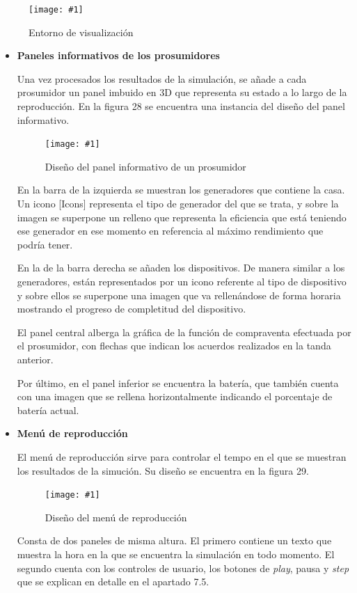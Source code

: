 \documentclass[12pt,a4paper,openright,oneside]{article}
\newcommand{\includeImage}[3]
{
	\begin{figure}[H]
	\begin{center}
	\texttt{[image: \#1]}
	\end{center}
	\caption{#3}
	\end{figure}
}
\numberwithin{equation}{section}
\theoremstyle{definition}
\begin{document}
\includeImage{entorno_vis.png}{10}{Entorno de visualización}
\begin{itemize}
\item \textbf{Paneles informativos de los prosumidores}

Una vez procesados los resultados de la simulación, se añade a cada prosumidor un panel imbuido en 3D que representa su estado a lo largo de la reproducción. En la figura 28 se encuentra una instancia del diseño del panel informativo.

\includeImage{info_panel.png}{10}{Diseño del panel informativo de un prosumidor}

En la barra de la izquierda se muestran los generadores que contiene la casa. Un icono [Icons] representa el tipo de generador del que se trata, y sobre la imagen se superpone un relleno que representa la eficiencia que está teniendo ese generador en ese momento en referencia al máximo rendimiento que podría tener.

En la de la barra derecha se añaden los dispositivos. De manera similar a los generadores, están representados por un icono referente al tipo de dispositivo y sobre ellos se superpone una imagen que va rellenándose de forma horaria mostrando el progreso de completitud del dispositivo. 

El panel central alberga la gráfica de la función de compraventa efectuada por el prosumidor, con flechas que indican los acuerdos realizados en la tanda anterior. 

Por último, en el panel inferior se encuentra la batería, que también cuenta con una imagen que se rellena horizontalmente indicando el porcentaje de batería actual.

\item \textbf{Menú de reproducción}

El menú de reproducción sirve para controlar el tempo en el que se muestran los resultados de la simución. Su diseño se encuentra en la figura 29.

\includeImage{time.png}{10}{Diseño del menú de reproducción}

Consta de dos paneles de misma altura. El primero contiene un texto que muestra la hora en la que se encuentra la simulación en todo momento. El segundo cuenta con los controles de usuario, los botones de \textit{play}, pausa y \textit{step} que se explican en detalle en el apartado 7.5.
\end{itemize}
\end{document}
